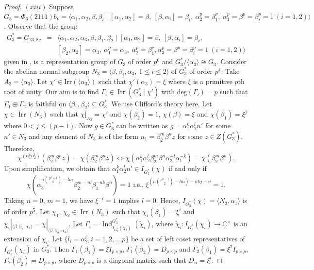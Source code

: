 \documentclass[a4paper,11pt]{amsart}
\numberwithin{equation}{section}
\numberwithin{equation}{subsection}
\newcommand{\C}{\mathbb{C}}
\newcommand{\Hom}{\mathrm{Hom}}
\newcommand{\tra}{\operatorname{tra}}
\begin{document}
\begin{proof}
$(xiii)$ 
Suppose $G_3= \Phi_6(2111){b_\nu}
= \langle \alpha_1, \alpha_2, \beta, \beta_i \mid [\alpha_1,\alpha_2] = \beta,\ 
[\beta,\alpha_i] = \beta_i,\ \alpha_2^p = \beta_1^\nu,\ \alpha_1^p = \beta^p = \beta_i^p = 1\ (i = 1,2) \rangle$. Observe that the group 
\begin{eqnarray*}
	G_3^*=G_{23,8\nu}&=& \langle \alpha_1, \alpha_2, \alpha_3, \beta, \beta_1, \beta_2 \mid [\alpha_1,\alpha_2] = \beta,\ [\beta,\alpha_i] = \beta_i,\ \\
	&& [\beta_2,\alpha_2] = \alpha_3,\ \alpha_1^p = \alpha_3,\ \alpha_2^p =\beta_1^\nu, \alpha_3^p = \beta^p = \beta_i^p = 1\ (i = 1,2) \rangle
\end{eqnarray*} given in \cite{presentation}, is a representation group of $G_3$ of order $p^6$ and ${G}_3^*/\langle \alpha_3 \rangle \cong G_3$. 
Consider the abelian normal subgroup
$N_3=\langle \beta, \beta_i, \alpha_3, \ 1 \le i \le 2 \rangle$ of ${G}_3^*$ of order $p^4$. 
Take $A_3=\langle \alpha_3 \rangle$. 
Let $\chi' \in \mathrm{Irr}(\langle \alpha_3 \rangle)$ such that $\chi'(\alpha_3)=\xi$
where $\xi$ is a primitive $p$th root of unity.  
Our aim is to find   $\Gamma_i \in \operatorname{Irr}(G_3^* \mid \chi')$ with deg$(\Gamma_i)=p$ such that $\Gamma_1 \oplus \Gamma_2$  is  faithful on $\langle \beta_1, \beta_2\rangle \subseteq G_3^*$.
We use Clifford's theory here. Let $\chi \in \operatorname{Irr}(N_3)$ such that
$\chi|_{A_3} = \chi'$ and $\chi(\beta_2) = 1$, $\chi(\beta) = \xi$ and $\chi(\beta_1) = \xi^j$ where  $0 < j \le (p-1)$. Now $g \in G_3^*$ can be written as $g = \alpha_1^k \alpha_2^l n'$
for some $n' \in N_3$ and any element of $N_3$ is of the form $n_1 = \beta_2^m \beta^n z$ for some $z \in Z(G_3^*)$.
Therefore,
$$\chi^{(\alpha_1^k \alpha_2^l)}(\beta_2^m \beta^n z) = \chi(\beta_2^m \beta^n z)
\iff \chi(\alpha_1^k \alpha_2^l \beta_2^m \beta^n  \alpha_2^{-l} \alpha_1^{-k}) = \chi(\beta_2^m \beta^n).$$
Upon simplification,  we obtain that
$\alpha_1^k \alpha_2^l n' \in I_{G_3^*}(\chi)$
if and only if
\[
\chi(\alpha_3^{n\binom{p^2-l}{2}-lm} \beta_2^{m-nl} \beta_1^{-nk}\beta^{n}) = 1 \text{ i.e., } \xi^{(n\binom{p^2-l}{2}-lm)-nkj+n} = 1.
\] 
Taking $n=0$, $m=1$, we have $\xi^{-l} = 1$ implies $l=0$.
Hence, $I_{G_3^*}(\chi) = \langle N_3, \alpha_1 \rangle$ is of order $p^5$. 
Let $\chi_1$, $\chi_2 \in \operatorname{Irr}(N_3)$ such that $\chi_i(\beta_1)=\xi^i$ and $\chi_i|_{\langle \beta,\beta_2, \alpha_3\rangle} = \chi |_{\langle \beta,\beta_2, \alpha_3\rangle}$. Let $\Gamma_i = \operatorname{Ind}^{G_3^*}_{I_{G_3^*}(\chi_i)}(\tilde{\chi}_i)$, where $\tilde{\chi}_i:I_{G_3^*}(\chi_i)\to \C^\times$ is an extension of $\chi_i$. Let $\{l_i=\alpha_2^i, i=1,2,..,p\}$ be a set of left coset representatives of $I_{G_3^*}(\chi_i)$ in $G_3^*$. Then $\Gamma_1(\beta_1)= \xi I_{p \times p}$, $\Gamma_1(\beta_2)= {D}_{p \times p}$ and $\Gamma_2(\beta_1)= \xi^2 I_{p \times p}$, $\Gamma_2(\beta_2)=  {D}_{p \times p}$, where $D_{p \times p}$ is a diagonal matrix such that $D_{ii}=\xi^{i}$. 

\end{proof}
\end{document}
